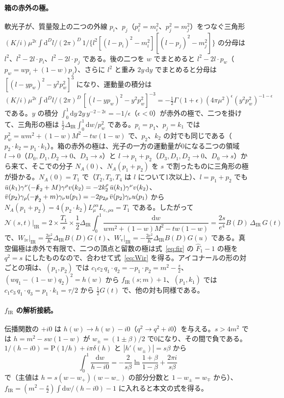 \documentclass[a4paper,10pt]{ltjsarticle}
\newcommand{\dd}{\mathrm{d}}
\newcommand{\DIR}{\Delta_{\mathrm{IR}}}
\begin{document}
\paragraph{箱の赤外の極。}軟光子が、質量殻上の二つの外線 $p_i$、$p_j$（$p_i^2=m_i^2$、$p_j^2=m_j^2$）をつなぐ三角形 $(K/i)\mu^{2\epsilon}\int\dd^Dl/(2\pi)^D\,1/\{l^2[(l-p_i)^2-m_i^2][(l-p_j)^2-m_j^2]\}$ の分母は $l^2$、$l^2-2l\cdot p_i$、$l^2-2l\cdot p_j$ である。後の二つを $w$ でまとめると $l^2-2l\cdot p_w$（$p_w=wp_i+(1-w)p_j$）、さらに $l^2$ と重み $2y\,\dd y$ でまとめると分母は $[(l-yp_w)^2-y^2p_w^2]^3$ になり、運動量の積分は $(K/i)\mu^{2\epsilon}\int\dd^Dl/(2\pi)^D\,[(l-yp_w)^2-y^2p_w^2]^{-3}=-\frac12\Gamma(1+\epsilon)(4\pi\mu^2)^\epsilon(y^2p_w^2)^{-1-\epsilon}$ である。$y$ の積分 $\int_0^1\dd y\,2y\,y^{-2-2\epsilon}=-1/\epsilon$（$\epsilon<0$）が赤外の極で、二つを掛けて、三角形の極は $\frac12\DIR\int_0^1\dd w/p_w^2$ である。$p_i=p_1$、$p_j=k_1$ では $p_w^2=wm^2+(1-w)M^2-tw(1-w)$ で、$p_2$、$k_2$ の対でも同じである（$p_2\cdot k_2=p_1\cdot k_1$）。箱の赤外の極は、光子の一方の運動量が0になる二つの領域 $l\to0$（$D_0,D_1,D_2\to0$、$D_3\to s$）と $l\to p_1+p_2$（$D_3,D_1,D_2\to0$、$D_0\to s$）から来て、そこでの分子 $N_A(0)$、$N_A(p_1+p_2)$ を $s$ で割ったものに三角形の極が掛かる。$N_A(0)=T_1$ で（$T_2,T_3,T_4$ は $l$ について1次以上）、$l=p_1+p_2$ でも $\bar u(k_1)\gamma^\nu(-\slashed k_2+M)\gamma^\rho v(k_2)=-2k_2^\rho\,\bar u(k_1)\gamma^\nu v(k_2)$、$\bar v(p_2)\gamma_\rho(-\slashed p_2+m)\gamma_\nu u(p_1)=-2p_{2\rho}\,\bar v(p_2)\gamma_\nu u(p_1)$ から $N_A(p_1+p_2)=4(p_2\cdot k_2)L_\mu^{\rho\alpha}L_{e,\rho\alpha}=T_1$ である。したがって
\begin{equation*}
\mathcal N(s,t)\big|_{\mathrm{IR}}=2\times\frac{T_1}{s}\times\frac12\DIR\int_0^1\frac{\dd w}{wm^2+(1-w)M^2-tw(1-w)}=\frac{2s}{e^4}B(D)\,\DIR\,G(t)
\end{equation*}
で、$W_{\mathrm{iv}}|_{\mathrm{IR}}=\frac{2e^2}{K}\DIR B(D)G(t)$、$W_{\mathrm v}|_{\mathrm{IR}}=-\frac{2e^2}{K}\DIR B(D)G(u)$ である。真空偏極は赤外で有限で、二つの頂点と留数の極は式~\eqref{eq:fir} の $\hat F_1-1$ の極を $q^2=s$ にしたものなので、合わせて式~\eqref{eq:Wir} を得る。アイコナールの形の対ごとの項は、$(p_1,p_2)$ では $c_1c_2\,q_1\cdot q_2=-p_1\cdot p_2=m^2-\frac s2$、$(wq_1-(1-w)q_2)^2=h(w)$ から $f_{\mathrm{IR}}(s;m)+1$、$(p_1,k_1)$ では $c_1c_3\,q_1\cdot q_3=p_1\cdot k_1=\tau/2$ から $\frac12G(t)$ で、他の対も同様である。

\paragraph{$f_{\mathrm{IR}}$ の解析接続。}伝播関数の $+i0$ は $h(w)\to h(w)-i0$（$q^2\to q^2+i0$）を与える。$s>4m^2$ では $h=m^2-sw(1-w)$ が $w_\pm=(1\pm\beta)/2$ で0になり、その間で負である。$1/(h-i0)=\mathrm P(1/h)+i\pi\delta(h)$ と $|h'(w_\pm)|=s\beta$ から
\begin{equation*}
\int_0^1\frac{\dd w}{h-i0}=-\frac{2}{s\beta}\ln\frac{1+\beta}{1-\beta}+\frac{2\pi i}{s\beta}
\end{equation*}
で（主値は $h=s(w-w_+)(w-w_-)$ の部分分数と $1-w_\pm=w_\mp$ から）、$f_{\mathrm{IR}}=(m^2-\frac s2)\int\dd w/(h-i0)-1$ に入れると本文の式を得る。
\end{document}

